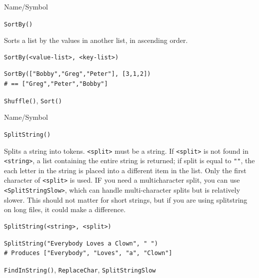 \begin{desc}{Name/Symbol}
\item[Name/Symbol] 	\verb+SortBy()+

\item[Description] 	Sorts a list by the values in another list, in ascending
		order.

\item[Usage]
\begin{verbatim}
SortBy(<value-list>, <key-list>)
\end{verbatim}

\item[Example]
\begin{verbatim}
SortBy(["Bobby","Greg","Peter"], [3,1,2]) 
# == ["Greg","Peter","Bobby"]
\end{verbatim}

\item[See Also]    	\verb+Shuffle()+, \verb+Sort()+
\end{desc}




\begin{desc}{Name/Symbol}
\item[Name/Symbol]  	\verb+SplitString()+

\item[Description]	Splits a string into tokens. \verb+<split>+ must be a string. If 
		\verb+<split>+ is not found in \verb+<string>+, a list containing the entire 
		string is returned; if split is equal to \verb+""+, the each letter 
		in the string is placed into a different item in the list.  Only the first character of \verb+<split>+ is used.  IF you need a multicharacter split, you can use \verb+<SplitStringSlow>+, which can handle multi-character splits but is relatively slower. This should not matter for short strings, but if you are using splitstring on long files, it could make a difference.


\item[Usage]
\begin{verbatim}
SplitString(<string>, <split>)
\end{verbatim}

\item[Example]      	
\begin{verbatim}
SplitString("Everybody Loves a Clown", " ") 
# Produces ["Everybody", "Loves", "a", "Clown"]
\end{verbatim}

\item[See Also]     	\verb+FindInString()+, \verb+ReplaceChar+, \verb+SplitStringSlow+
\end{desc}



